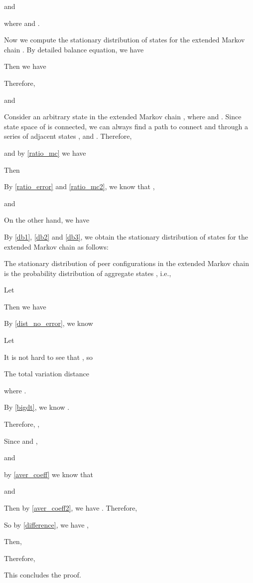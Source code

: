 \documentclass[10pt,conference]{IEEEtran}
\begin{document}
and

where  and
.

Now we compute the stationary distribution of states for the
extended Markov chain . By detailed balance equation, we have


Then we have


Therefore,

and


Consider an arbitrary state  in the extended Markov chain
, where  and . Since
state space of  is connected, we can always find a path to
connect  and  through a series of adjacent states
, and . Therefore,


and by \eqref{ratio_mc} we have


Then


By \eqref{ratio_error} and \eqref{ratio_mc2}, we know that ,

and


On the other hand, we have


By \eqref{db1}, \eqref{db2} and \eqref{db3}, we obtain the
stationary distribution of states for the extended Markov chain 
as follows:


The stationary distribution of peer configurations in the extended
Markov chain  is the probability distribution of aggregate
states , i.e.,


Let 

Then we have


By \eqref{dist_no_error}, we know


Let


It is not hard to see that , so


The total variation distance

where .

By \eqref{bigdt}, we know .

Therefore, ,


Since  and ,

and

by \eqref{aver_coeff} we know that 

and


Then by \eqref{aver_coeff2}, we have . Therefore,


So by \eqref{difference}, we have ,


Then,


Therefore,


This concludes the proof.
\end{document}
